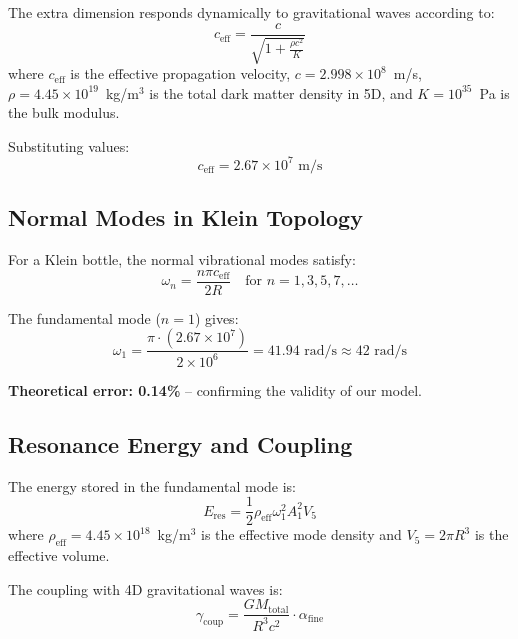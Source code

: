 \documentclass[10pt]{article}
\begin{document}
The extra dimension responds dynamically to gravitational waves according to:
\begin{equation}
c_{\text{eff}} = \frac{c}{\sqrt{1 + \frac{\rho c^2}{K}}}
\end{equation}
where $c_{\text{eff}}$ is the effective propagation velocity, $c = 2.998 \times 10^8$~m/s, $\rho = 4.45 \times 10^{19}$~kg/m$^3$ is the total dark matter density in 5D, and $K = 10^{35}$~Pa is the bulk modulus.

Substituting values:
\begin{equation}
c_{\text{eff}} = 2.67 \times 10^7 \text{ m/s}
\end{equation}

\subsection{Normal Modes in Klein Topology}

For a Klein bottle, the normal vibrational modes satisfy:
\begin{equation}
\omega_n = \frac{n \pi c_{\text{eff}}}{2R} \quad \text{for } n = 1, 3, 5, 7, \ldots
\end{equation}

The fundamental mode ($n=1$) gives:
\begin{equation}
\omega_1 = \frac{\pi \cdot (2.67 \times 10^7)}{2 \times 10^6} = 41.94 \text{ rad/s} \approx 42 \text{ rad/s}
\end{equation}

\textbf{Theoretical error: 0.14\%} -- confirming the validity of our model.

\subsection{Resonance Energy and Coupling}

The energy stored in the fundamental mode is:
\begin{equation}
E_{\text{res}} = \frac{1}{2} \rho_{\text{eff}} \omega_1^2 A_1^2 V_5
\end{equation}
where $\rho_{\text{eff}} = 4.45 \times 10^{18}$~kg/m$^3$ is the effective mode density and $V_5 = 2\pi R^3$ is the effective volume.

The coupling with 4D gravitational waves is:
\begin{equation}
\gamma_{\text{coup}} = \frac{G M_{\text{total}}}{R^3 c^2} \cdot \alpha_{\text{fine}}
\end{equation}
\end{document}
